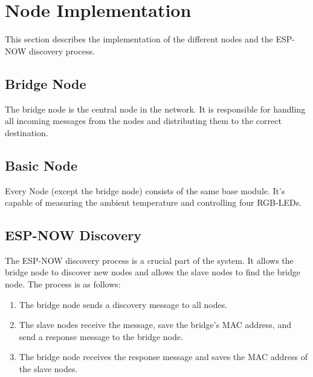 \section{Node Implementation} \label{sec:node_implemtenation}
This section describes the implementation of the different nodes and the ESP-NOW
discovery process.
    \subsection{Bridge Node} 
    The bridge node is the central node in the network. It is responsible for
    handling all incoming messages from the nodes and distributing them to the
    correct destination.


    \subsection{Basic Node}
    Every Node (except the bridge node) consists of the same base module. It's
    capable of measuring the ambient temperature and controlling four RGB-LEDs.


    \subsection{ESP-NOW Discovery}
    The ESP-NOW discovery process is a crucial part of the system. It allows the
    bridge node to discover new nodes and allows the slave nodes to find the bridge
    node. The process is as follows:
    \begin{enumerate}
        \item The bridge node sends a discovery message to all nodes.
        \item The slave nodes receive the message, save the bridge's MAC address, and
        send a response message to the bridge node.
        \item The bridge node receives the response message and saves the MAC address
        of the slave nodes.
    \end{enumerate}